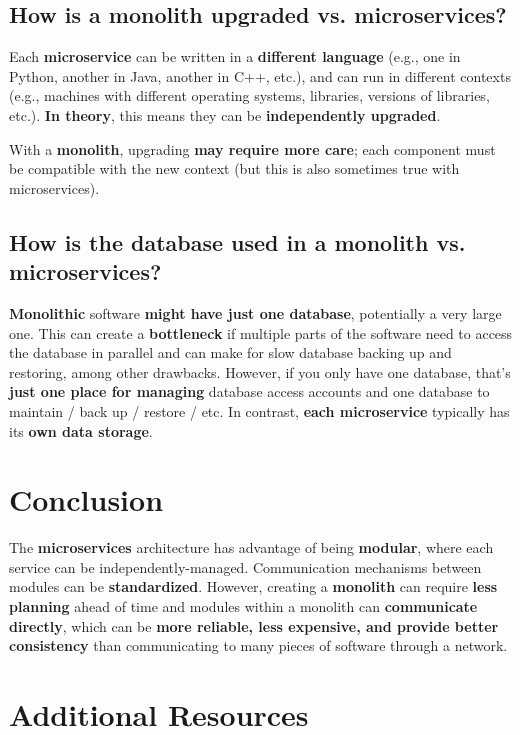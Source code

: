 \subsection{How is a monolith upgraded vs. microservices?}

Each \textbf{microservice} can be written in a \textbf{different language} (e.g., one in Python, another in Java, another in C++, etc.), and can run in different contexts (e.g., machines with different operating systems, libraries, versions of libraries, etc.). \textbf{In theory}, this means they can be \textbf{independently upgraded}.

With a \textbf{monolith}, upgrading \textbf{may require more care}; each component must be compatible with the new context (but this is also sometimes true with microservices).

\subsection{How is the database used in a monolith vs. microservices?}

\textbf{Monolithic} software \textbf{might have just one database}, potentially a very large one. This can create a \textbf{bottleneck} if multiple parts of the software need to access the database in parallel and can make for slow database backing up and restoring, among other drawbacks. However, if you only have one database, that's \textbf{just one place for managing} database access accounts and one database to maintain / back up / restore / etc. In contrast, \textbf{each microservice} typically has its \textbf{own data storage}.

\section{Conclusion}
The \textbf{microservices} architecture has advantage of being \textbf{modular}, where each service can be independently-managed. Communication mechanisms between modules can be \textbf{standardized}. However, creating a \textbf{monolith} can require \textbf{less planning} ahead of time and modules within a monolith can \textbf{communicate directly}, which can be \textbf{more reliable, less expensive, and provide better consistency} than communicating to many pieces of software through a network.

\section{Additional Resources}

